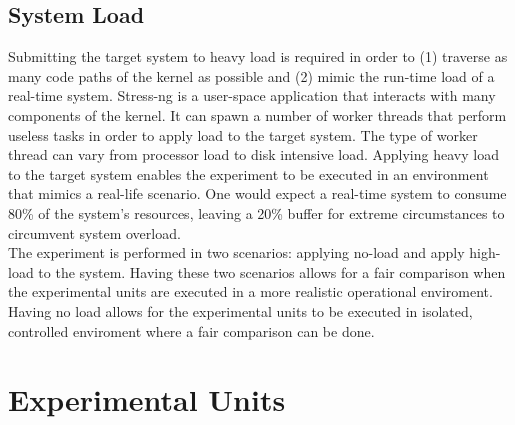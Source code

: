 \subsection{System Load}
Submitting the target system to heavy load is required in order to (1) traverse as many code paths of the kernel as possible and (2) mimic the run-time load of a real-time system. Stress-ng \cite{stress-ng} is a user-space application that interacts with many components of the kernel. It can spawn a number of worker threads that perform useless tasks in order to apply load to the target system. The type of worker thread can vary from processor load to disk intensive load. Applying heavy load to the target system enables the experiment to be executed in an environment that mimics a real-life scenario. One would expect a real-time system to consume 80\% of the system's resources, leaving a 20\% buffer for extreme circumstances to circumvent system overload. \\

The experiment is performed in two scenarios: applying no-load and apply high-load to the system. Having these two scenarios allows for a fair comparison when the experimental units are executed in a more realistic operational enviroment. Having no load allows for the experimental units to be executed in isolated, controlled enviroment where a fair comparison can be done.




\section{Experimental Units}
\label{section:exp-units}

